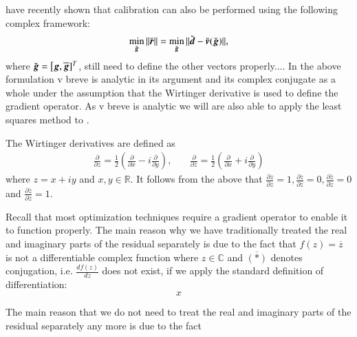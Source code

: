 \documentclass[a4paper,fleqn,usenatbib]{mnras}
\newcommand{\br}{\bmath{r}}
\newcommand{\bg}{\bmath{g}}
\newcommand{\bd}{\bmath{d}}
\newcommand{\bv}{\bmath{v}}
\newcommand{\conj}[1]{\overline{#1}}
\begin{document}
\citet{Smirnov2015} have recently shown that calibration can also be performed using the following complex framework: 
\begin{equation}
\min_{\breve{\bg}}\|\breve{\br}\| = \min_{\breve{\bg}}\|\breve{\bd} - \breve{\bv}(\breve{\bg})\|, 
\end{equation}
where $\breve{\bg} = \big[\bg,\conj{\bg}]^T$, still need to define the other vectors properly....
In the above formulation v breve is analytic in its argument and its complex conjugate as a whole under the assumption that the Wirtinger derivative
is used to define the gradient operator. As v breve is analytic we will are also able to apply the least squares method to .   

The Wirtinger derivatives are defined as
\begin{eqnarray}
\frac{\partial}{\partial z} = \frac{1}{2}\left ( \frac{\partial}{\partial x} -  i \frac{\partial}{\partial y} \right ),&~&\frac{\partial}{\partial \conj{z}} = \frac{1}{2}\left ( \frac{\partial}{\partial x} +  i \frac{\partial}{\partial y} \right ) 
\end{eqnarray}
where $z = x + iy$ and $x,y \in \mathbb{R}$. It follows from the above that $\frac{\partial z}{\partial z} = 1,\frac{\partial z}{\partial \conj{z}} = 0,\frac{\partial \conj{z}}{\partial z} = 0$ and $\frac{\partial \conj{z}}{\partial \conj{z}} = 1$.







Recall that most optimization techniques require a gradient operator to enable it to function properly. The main reason why we have traditionally treated 
the real and imaginary parts of the residual separately is due to the fact that $f(z) = \conj{z}$ is not a differentiable complex function where $z\in\mathbb{C}$ and $\conj{(*)}$ denotes conjugation, i.e. $\frac{df(z)}{dz}$
does not exist, if we apply the standard definition of differentiation:
\begin{equation}
x
\end{equation}



The main reason that we do not need to treat the real and imaginary parts of the residual separately any more is due to the 
fact 
\end{document}
